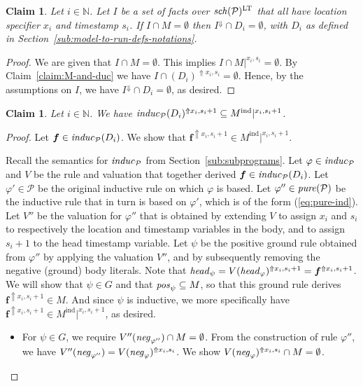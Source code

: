 \documentclass{tlp}
\newtheorem{claim}[theorem]{Claim}
\newcommand{\Nat}{\mathbb{N}}  \newcommand{\len}[1]{|#1|} \newcommand{\rom}[1]{\text{\emph{(#1)}}} \newcommand{\romI}{\rom i}
\newcommand{\ded}{\mathcal{P}}
\newcommand{\fc}{\boldsymbol{f}}
\newcommand{\rl}{\varphi}
\newcommand{\head}[1]{\fname{head}_{#1}}
\newcommand{\bpos}[1]{\fname{pos}_{#1}}
\newcommand{\bneg}[1]{\fname{neg}_{#1}}
\newcommand{\schof}[1]{\fname{sch}(#1)}
\newcommand{\grl}{\psi}
\newcommand{\toloct}[1]{#1^{\mathrm{LT}}}
\newcommand{\addlt}[3]{#1^{\Uparrow#2,#3}}
\newcommand{\projlt}[3]{#1|^{#2,#3}}
\newcommand{\droplt}[1]{#1^{\Downarrow}}
\newcommand{\pure}[1]{\fname{pure}(#1)}
\newcommand{\induc}[1]{\fname{induc}_{#1}}
\newcommand{\mstep}[1]{(#1)}
\newcommand{\grded}{G}
\newcommand{\Mind}{M^{\mathrm{ind}}}
\begin{document}
\begin{appendix}
\tline



\begin{claim}\label{claim:not-in-M-not-in-duc-ver2}Let $i\in\Nat$.
Let $I$ be a set of facts over $\toloct{\schof{\ded}}$ that all
have location specifier $x_{i}$ and timestamp $s_{i}$. If $I\cap M=\emptyset$
then $\droplt I\cap D_{i}=\emptyset$, with $D_{i}$ as defined in
Section~\ref{sub:model-to-run-defs-notations}.\end{claim}

\begin{proof}

We are given that $I\cap M=\emptyset$. This implies $I\cap\projlt M{x_{i}}{s_{i}}=\emptyset$.
By Claim~\ref{claim:M-and-duc} we have $I\cap\addlt{(D_{i})}{x_{i}}{s_{i}}=\emptyset$.
Hence, by the assumptions on $I$, we have $\droplt I\cap D_{i}=\emptyset$,
as desired.\end{proof}



\tline



\begin{claim}\label{claim:ind-induc-in-M}Let $i\in\Nat$. We have
$\addlt{\induc{\ded}\mstep{D_{i}}}{x_{i}}{s_{i}+1}\subseteq\projlt{\Mind}{x_{i}}{s_{i}+1}$.\end{claim}

\begin{proof}Let $\fc\in\induc{\ded}\mstep{D_{i}}$. We show that
$\addlt{\fc}{x_{i}}{s_{i}+1}\in\projlt{\Mind}{x_{i}}{s_{i}+1}$. 

Recall the semantics for $\induc{\ded}$ from Section~\ref{sub:subprograms}.
Let $\rl\in\induc{\ded}$ and $V$ be the rule and valuation that
together derived $\fc\in\induc{\ded}\mstep{D_{i}}$. Let $\rl'\in\ded$
be the original inductive rule on which $\rl$ is based. Let $\rl''\in\pure{\ded}$
be the inductive rule that in turn is based on $\rl'$, which is of
the form (\ref{eq:pure-ind}). Let $V''$ be the valuation for $\rl''$
that is obtained by extending $V$ to assign $x_{i}$ and $s_{i}$
to respectively the location and timestamp variables in the body,
and to assign $s_{i}+1$ to the head timestamp variable. Let $\grl$
be the positive ground rule obtained from $\rl''$ by applying the
valuation $V''$, and by subsequently removing the negative (ground)
body literals. Note that $\head{\grl}=\addlt{V(\head{\rl})}{x_{i}}{s_{i}+1}=\addlt{\fc}{x_{i}}{s_{i}+1}$.
We will show that $\grl\in\grded$ and that $\bpos{\grl}\subseteq M$,
so that this ground rule derives $\addlt{\fc}{x_{i}}{s_{i}+1}\in M$.
And since $\grl$ is inductive, we more specifically have $\addlt{\fc}{x_{i}}{s_{i}+1}\in\projlt{\Mind}{x_{i}}{s_{i}+1}$,
as desired.
\begin{itemize}
\item For $\grl\in\grded$, we require $V''(\bneg{\rl''})\cap M=\emptyset$.
From the construction of rule $\rl''$, we have $V''(\bneg{\rl''})=\addlt{V(\bneg{\rl})}{x_{i}}{s_{i}}$.
We show $\addlt{V(\bneg{\rl})}{x_{i}}{s_{i}}\cap M=\emptyset$. 



\end{itemize}
\end{proof}
\end{appendix}
\end{document}
